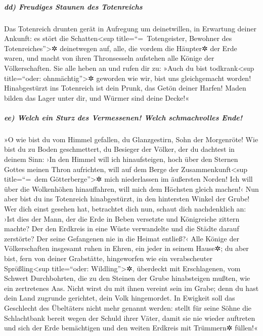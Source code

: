 \hypertarget{dd-freudiges-staunen-des-totenreichs}{%
\subparagraph{dd) Freudiges Staunen des
Totenreichs}\label{dd-freudiges-staunen-des-totenreichs}}

Das Totenreich drunten gerät in Aufregung um deinetwillen,
in Erwartung deiner Ankunft: es stört die Schatten\textless sup
title=``=~Totengeister, Bewohner des Totenreiches''\textgreater✲
deinetwegen auf, alle, die vordem die Häupter✲ der Erde waren, und macht
von ihren Thronsesseln aufstehen alle Könige der Völkerschaften.
Sie alle heben an und rufen dir zu: »Auch du bist
todkrank\textless sup title=``oder: ohnmächtig''\textgreater✲ geworden
wie wir, bist uns gleichgemacht worden! Hinabgestürzt ins
Totenreich ist dein Prunk, das Getön deiner Harfen! Maden bilden das
Lager unter dir, und Würmer sind deine Decke!«

\hypertarget{ee-welch-ein-sturz-des-vermessenen-welch-schmachvolles-ende}{%
\subparagraph{ee) Welch ein Sturz des Vermessenen! Welch schmachvolles
Ende!}\label{ee-welch-ein-sturz-des-vermessenen-welch-schmachvolles-ende}}

»O wie bist du vom Himmel gefallen, du Glanzgestirn, Sohn
der Morgenröte! Wie bist du zu Boden geschmettert, du Besieger der
Völker, der du dachtest in deinem Sinn: ›In den Himmel
will ich hinaufsteigen, hoch über den Sternen Gottes meinen Thron
aufrichten, will auf dem Berge der Zusammenkunft\textless sup
title=``=~dem Götterberge''\textgreater✲ mich niederlassen im äußersten
Norden! Ich will über die Wolkenhöhen hinauffahren, will
mich dem Höchsten gleich machen!‹ Nun aber bist du ins
Totenreich hinabgestürzt, in den hintersten Winkel der Grube!
Wer dich einst gesehen hat, betrachtet dich nun, schaut
dich nachdenklich an: ›Ist dies der Mann, der die Erde in Beben
versetzte und Königreiche zittern machte? Der den
Erdkreis in eine Wüste verwandelte und die Städte darauf zerstörte? Der
seine Gefangenen nie in die Heimat entließ?‹ Alle Könige
der Völkerschaften insgesamt ruhen in Ehren, ein jeder in seinem Hause✲;
du aber bist, fern von deiner Grabstätte, hingeworfen wie
ein verabscheuter Sprößling\textless sup title=``oder:
Wildling''\textgreater✲, überdeckt mit Erschlagenen, vom Schwert
Durchbohrten, die zu den Steinen der Grube hinabsteigen mußten, wie ein
zertretenes Aas. Nicht wirst du mit ihnen vereint sein im
Grabe; denn du hast dein Land zugrunde gerichtet, dein Volk hingemordet.
In Ewigkeit soll das Geschlecht des Übeltäters nicht mehr genannt
werden: stellt für seine Söhne die Schlachtbank bereit
wegen der Schuld ihrer Väter, damit sie nie wieder auftreten und sich
der Erde bemächtigen und den weiten Erdkreis mit Trümmern✲ füllen!«


